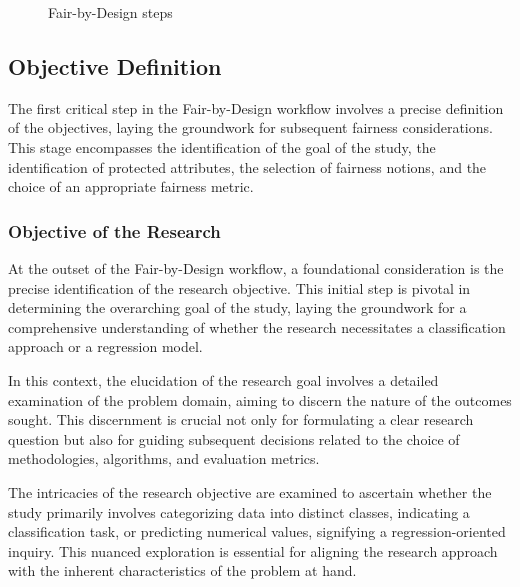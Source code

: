 \begin{figure}[H]
    \centering
    \caption{Fair-by-Design steps}
\end{figure}
    

\subsection{Objective Definition}
\label{subsection:objective}

The first critical step in the Fair-by-Design workflow involves a precise definition of the objectives, laying the groundwork for subsequent fairness considerations. This stage encompasses the identification of the goal of the study, the identification of protected attributes, the selection of fairness notions, and the choice of an appropriate fairness metric.

\subsubsection{Objective of the Research}

At the outset of the Fair-by-Design workflow, a foundational consideration is the precise identification of the research objective. This initial step is pivotal in determining the overarching goal of the study, laying the groundwork for a comprehensive understanding of whether the research necessitates a classification approach or a regression model.

In this context, the elucidation of the research goal involves a detailed examination of the problem domain, aiming to discern the nature of the outcomes sought. This discernment is crucial not only for formulating a clear research question but also for guiding subsequent decisions related to the choice of methodologies, algorithms, and evaluation metrics.

The intricacies of the research objective are examined to ascertain whether the study primarily involves categorizing data into distinct classes, indicating a classification task, or predicting numerical values, signifying a regression-oriented inquiry. This nuanced exploration is essential for aligning the research approach with the inherent characteristics of the problem at hand.

